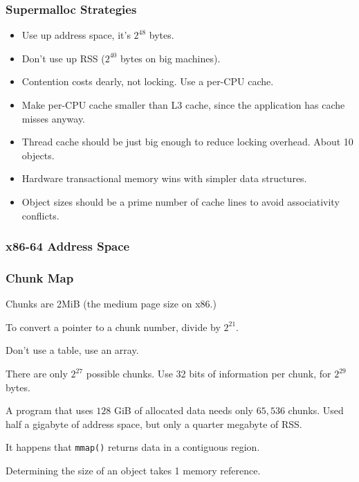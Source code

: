\documentclass[xcolor=dvipsnames,14pt]{beamer}
\begin{document}









\begin{frame}
\frametitle{Supermalloc Strategies}

\begin{itemize}
\item Use up address space, it's $2^{48}$ bytes.
\item Don't use up RSS ($2^{40}$ bytes on big machines).
\item Contention costs dearly, not locking.  Use a per-CPU cache.
\item Make per-CPU cache smaller than L3 cache, since the application
  has cache misses anyway.
\item Thread cache should be just big enough to reduce locking overhead.  About 10 objects.
\item Hardware transactional memory wins with simpler data structures.
\item Object sizes should be a prime number of cache lines to avoid associativity conflicts.
\end{itemize}
\end{frame}

\begin{frame}
\frametitle{x86-64 Address Space}


\end{frame}

\begin{frame}
\frametitle{Chunk Map}

Chunks are 2MiB (the medium page size on x86.)

To convert a pointer to a chunk number, divide by $2^{21}$.

Don't use a table, use an array.

There are only $2^{27}$ possible chunks.  Use 32 bits of information
per chunk, for $2^{29}$ bytes.

A program that uses $128$ GiB of allocated data needs only $65,536$
chunks.  Used half a gigabyte of address space, but only a quarter
megabyte of RSS.

It happens that \texttt{mmap()} returns data in a contiguous region.

Determining the size of an object takes 1 memory reference.

\end{frame}
\end{document}
